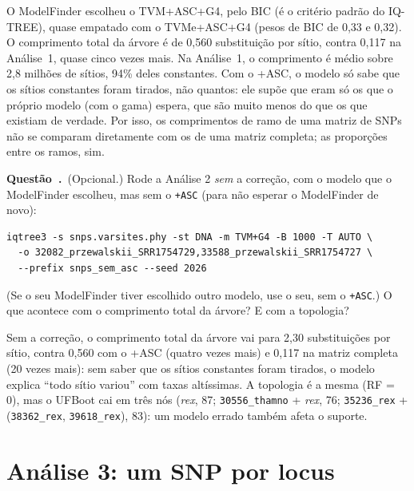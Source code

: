 \documentclass[11pt,a4paper]{article}
\newcommand{\cmd}[1]{\texttt{#1}}
\newcounter{questao}
\newcommand{\questao}{\par\needspace{3\baselineskip}\refstepcounter{questao}\noindent\textbf{Questão~\thequestao.}\ }
\begin{document}
\begin{resposta}
O ModelFinder escolheu o TVM+ASC+G4, pelo BIC (é o critério padrão do IQ-TREE), quase
empatado com o TVMe+ASC+G4 (pesos de BIC de 0,33 e 0,32). O comprimento total da árvore é de
0,560 substituição por sítio, contra 0,117 na Análise~1, quase cinco vezes mais. Na Análise~1,
o comprimento é médio sobre 2,8 milhões de sítios, 94\% deles constantes. Com o +ASC, o modelo
só sabe que os sítios constantes foram tirados, não quantos: ele supõe que eram só os que o
próprio modelo (com o gama) espera, que são muito menos do que os que existiam de verdade. Por
isso, os comprimentos de ramo de uma matriz de SNPs não se comparam diretamente com os de uma
matriz completa; as proporções entre os ramos, sim.
\end{resposta}

\questao (Opcional.) Rode a Análise 2 \emph{sem} a correção, com o modelo que o ModelFinder
escolheu, mas sem o \cmd{+ASC} (para não esperar o ModelFinder de novo):
\begin{Verbatim}
iqtree3 -s snps.varsites.phy -st DNA -m TVM+G4 -B 1000 -T AUTO \
  -o 32082_przewalskii_SRR1754729,33588_przewalskii_SRR1754727 \
  --prefix snps_sem_asc --seed 2026
\end{Verbatim}
(Se o seu ModelFinder tiver escolhido outro modelo, use o seu, sem o \cmd{+ASC}.) O que acontece
com o comprimento total da árvore? E com a topologia?

\begin{resposta}
Sem a correção, o comprimento total da árvore vai para 2,30 substituições por sítio, contra
0,560 com o +ASC (quatro vezes mais) e 0,117 na matriz completa (20 vezes mais): sem saber que os
sítios constantes foram tirados, o modelo explica ``todo sítio variou'' com taxas altíssimas. A
topologia é a mesma (RF = 0), mas o UFBoot cai em três nós (\emph{rex}, 87;
\cmd{30556\_thamno} + \emph{rex}, 76; \cmd{35236\_rex} + (\cmd{38362\_rex}, \cmd{39618\_rex}),
83): um modelo errado também afeta o suporte.
\end{resposta}

\section{Análise 3: um SNP por locus}
\end{document}
